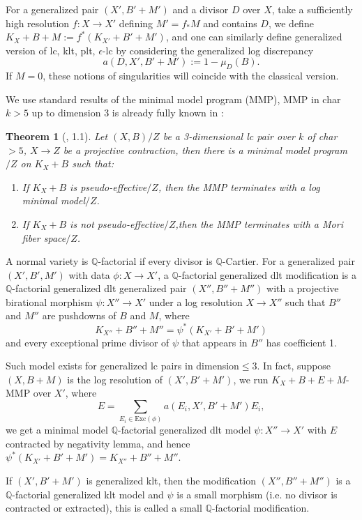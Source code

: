 \documentclass[letterpaper,reqno,12pt]{amsart}
\numberwithin{equation}{section}
\theoremstyle{plain}
\newtheorem{theorem}{Theorem}[section]
\begin{document}
For a generalized pair $(X',B'+M')$ and a divisor $D$ over $X$, take a sufficiently high resolution $f:X\to X'$ defining $M'=f_*M$ and contains $D$, we define $K_X+B+M:=f^*(K_{X'}+B'+M')$, and one can similarly define generalized version of lc, klt, plt, $\epsilon$-lc by considering the generalized log discrepancy \[a(D,X',B'+M'):=1-\mu_D(B).\]If $M=0$, these notions of singularities will coincide with the classical version.

We use standard results of the minimal model program (MMP), MMP in char $k>5$ up to dimension 3 is already fully known in \cite{KYH20lcmmp}:
\begin{theorem}[\cite{KYH20lcmmp}, 1.1]\label{MMP}
    Let $(X,B)/Z$ be a 3-dimensional lc pair over $k$ of char $>5$, $X\to Z$ be a projective contraction, then there is a minimal model program$/Z$ on $K_X+B$ such that:
    \begin{enumerate}
        \item If $K_X+B$ is pseudo-effective$/Z$, then the MMP terminates with a log minimal model$/Z$.
        \item If $K_X+B$ is not pseudo-effective$/Z$,then the MMP terminates with a Mori fiber space$/Z$.
    \end{enumerate}
\end{theorem}

A normal variety is $\mathbb Q$-factorial if every divisor is $\mathbb Q$-Cartier. For a generalized pair $(X',B',M')$ with data $\phi:X\to X'$, a $\mathbb Q$-factorial generalized dlt modification is a $\mathbb Q$-factorial generalized dlt generalized pair $(X'',B''+M'')$ with a projective birational morphism $\psi:X''\to X'$ under a log resolution $X\to X''$ such that $B''$ and $M''$ are pushdowns of $B$ and $M$, where \[K_{X''}+B''+M''=\psi^*(K_{X'}+B'+M')\] and every exceptional prime divisor of $\psi$ that appears in $B''$ has coefficient 1. 

Such model exists for generalized lc pairs in dimension$\leq 3$. In fact, suppose $(X,B+M)$ is the log resolution of $(X',B'+M')$, we run $K_X+B+E+M$-MMP over $X'$, where 
\[E=\sum\limits_{E_i \in\text{Exc}(\phi)}a(E_i,X',B'+M')E_i,\]
we get a minimal model $\mathbb Q$-factorial generalized dlt model $\psi:X''\to X'$ with $E$ contracted by negativity lemma, and hence $\psi^*(K_{X'}+B'+M')=K_{X''}+B''+M''$.

If $(X',B'+M')$ is generalized klt, then the modification $(X'',B''+M'')$ is a $\mathbb Q$-factorial generalized klt model and $\psi$ is a small morphism (i.e. no divisor is contracted or extracted), this is called a small $\mathbb Q$-factorial modification.
\end{document}
